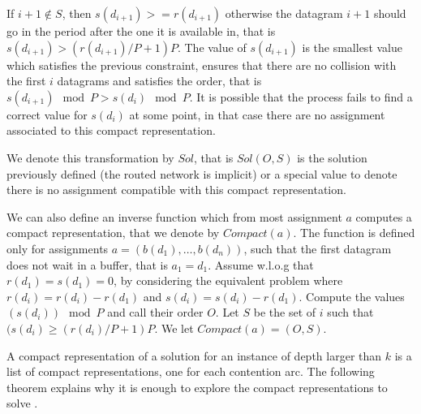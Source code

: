 \documentclass[english]{article}
\begin{document}
If $i+1 \notin S$, then $s(d_{i+1}) >= r(d_{i+1})$ otherwise the datagram $i+1$ should go in the period after the one it is available in, that is $s(d_{i+1}) > (r(d_{i+1})/P + 1)P$.
The value of  $s(d_{i+1})$ is the smallest value which satisfies the previous constraint,
ensures that there are no collision with the first $i$ datagrams and  satisfies the order, that is $s(d_{i+1}) \mod P > s(d_i) \mod P$. 
It is possible that the process fails to find a correct value for $s(d_i)$ at some point,
in that case there are no assignment associated to this compact representation.

We denote this transformation by $Sol$, that is $Sol(O,S)$ is the solution previously defined
(the routed network is implicit) or a special value to denote there is no assignment compatible with this compact representation. 

We can also define an inverse function which from most assignment $a$ computes a compact representation, that we denote by $Compact(a)$. The function is defined only for
assignments $a = (b(d_1),\dots,b(d_n))$, such that the first datagram does not wait in a buffer, that is $a_1 = d_1$. Assume w.l.o.g that $r(d_1) = s(d_1) = 0$, by considering the equivalent problem where $r(d_i)= r(d_i) -r(d_1)$ and $s(d_i) = s(d_i) - r(d_1)$.
Compute the values $(s(d_i))\mod P$ and  call their order $O$. Let 
 $S$ be the set of $i$ such that $(s(d_i) \geq (r(d_i) / P + 1) P$. We let $Compact(a) = (O,S)$.


A compact representation of a solution for an instance of depth larger than $k$
is a list of compact representations, one for each contention arc. The following theorem explains why it is enough to explore the compact representations to solve \spall.
\end{document}
